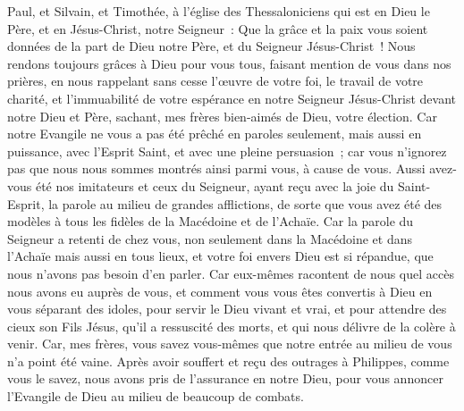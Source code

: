 \begin{multicols}{2}
\VerseOne{}Paul, et Silvain, et Timothée, à l'église des Thessaloniciens qui est en Dieu le Père, et en Jésus-Christ, notre Seigneur~: Que la grâce et la paix vous soient données de la part de Dieu notre Père, et du Seigneur Jésus-Christ~!
Nous rendons toujours grâces à Dieu pour vous tous, faisant mention de vous dans nos prières,
en nous rappelant sans cesse l'œuvre de votre foi, le travail de votre charité, et l'immuabilité de votre espérance en notre Seigneur Jésus-Christ devant notre Dieu et Père,
sachant, mes frères bien-aimés de Dieu, votre élection.
Car notre Evangile ne vous a pas été prêché en paroles seulement, mais aussi en puissance, avec l'Esprit Saint, et avec une pleine persuasion~; car vous n'ignorez pas que nous nous sommes montrés ainsi parmi vous, à cause de vous.
Aussi avez-vous été nos imitateurs et ceux du Seigneur, ayant reçu avec la joie du Saint-Esprit, la parole au milieu de grandes afflictions,
de sorte que vous avez été des modèles à tous les fidèles de la Macédoine et de l'Achaïe.
Car la parole du Seigneur a retenti de chez vous, non seulement dans la Macédoine et dans l'Achaïe mais aussi en tous lieux, et votre foi envers Dieu est si répandue, que nous n'avons pas besoin d'en parler.
Car eux-mêmes racontent de nous quel accès nous avons eu auprès de vous, et comment vous vous êtes convertis à Dieu en vous séparant des idoles, pour servir le Dieu vivant et vrai,
et pour attendre des cieux son Fils Jésus, qu'il a ressuscité des morts, et qui nous délivre de la colère à venir.
\VerseOne{}Car, mes frères, vous savez vous-mêmes que notre entrée au milieu de vous n'a point été vaine. 
Après avoir souffert et reçu des outrages à Philippes, comme vous le savez, nous avons pris de l'assurance en notre Dieu, pour vous annoncer l'Evangile de Dieu au milieu de beaucoup de combats.

\end{multicols}
